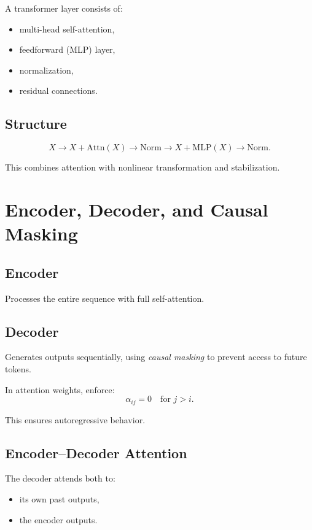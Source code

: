 A transformer layer consists of:
\begin{itemize}
    \item multi-head self-attention,
    \item feedforward (MLP) layer,
    \item normalization,
    \item residual connections.
\end{itemize}

\subsection{Structure}

\[
X \to X + \mathrm{Attn}(X) \to \text{Norm} \to X + \mathrm{MLP}(X) \to \text{Norm}.
\]

This combines attention with nonlinear transformation and stabilization.

\section{Encoder, Decoder, and Causal Masking}

\subsection{Encoder}

Processes the entire sequence with full self-attention.

\subsection{Decoder}

Generates outputs sequentially, using \emph{causal masking} to prevent access to future tokens.

\begin{definition}
In attention weights, enforce:
\[
\alpha_{ij} = 0 \quad \text{for } j > i.
\]
\end{definition}

This ensures autoregressive behavior.

\subsection{Encoder--Decoder Attention}

The decoder attends both to:
\begin{itemize}
    \item its own past outputs,
    \item the encoder outputs.
\end{itemize}

